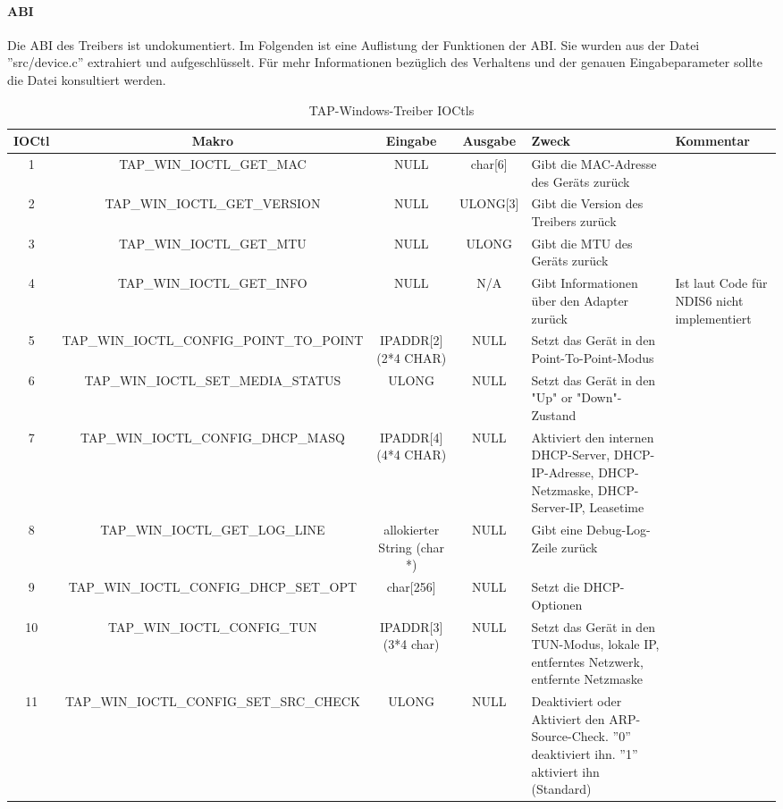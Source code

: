 \paragraph{ABI}
Die \ac{ABI} des Treibers ist undokumentiert. Im Folgenden ist eine Auflistung
der Funktionen der \ac{ABI}. Sie wurden aus der Datei ''src/device.c'' extrahiert
und aufgeschlüsselt. Für mehr Informationen bezüglich des Verhaltens und der
genauen Eingabeparameter sollte die Datei konsultiert werden.

\begin{table}
\tiny
\begin{tabularx}{\textwidth}{|c|c|c|c|X|X|}\firsthline
IOCtl & Makro & Eingabe & Ausgabe & Zweck & Kommentar \\ \hline
1 & TAP\_WIN\_IOCTL\_GET\_MAC & NULL & char[6] & Gibt die MAC-Adresse des Geräts zurück & \\ \hline
2 & TAP\_WIN\_IOCTL\_GET\_VERSION & NULL & ULONG[3] & Gibt die Version des Treibers zurück & \\ \hline
3 & TAP\_WIN\_IOCTL\_GET\_MTU & NULL & ULONG & Gibt die \ac{MTU} des Geräts zurück & \\ \hline
4 & TAP\_WIN\_IOCTL\_GET\_INFO & NULL & N/A & Gibt Informationen über den Adapter zurück
& Ist laut Code für NDIS6 nicht implementiert \\ \hline 
5 & TAP\_WIN\_IOCTL\_CONFIG\_POINT\_TO\_POINT & IPADDR[2] (2*4 CHAR) & NULL & Setzt das Gerät in den Point-To-Point-Modus
& \\ \hline
6 & TAP\_WIN\_IOCTL\_SET\_MEDIA\_STATUS & ULONG & NULL & Setzt das Gerät in den "Up" or "Down"-Zustand & \\ \hline
7 & TAP\_WIN\_IOCTL\_CONFIG\_DHCP\_MASQ & IPADDR[4] (4*4 CHAR) & NULL & Aktiviert den internen DHCP-Server, DHCP-IP-Adresse, DHCP-Netzmaske, DHCP-Server-IP, Leasetime & \\ \hline
8 & TAP\_WIN\_IOCTL\_GET\_LOG\_LINE & allokierter String (char *) & NULL & Gibt eine Debug-Log-Zeile zurück & \\ \hline
9 & TAP\_WIN\_IOCTL\_CONFIG\_DHCP\_SET\_OPT & char[256] & NULL & Setzt die DHCP-Optionen & \\ \hline
10 & TAP\_WIN\_IOCTL\_CONFIG\_TUN & IPADDR[3] (3*4 char) & NULL & Setzt das Gerät in den TUN-Modus, lokale IP, entferntes Netzwerk, entfernte Netzmaske & \\ \hline
11 & TAP\_WIN\_IOCTL\_CONFIG\_SET\_SRC\_CHECK & ULONG & NULL & Deaktiviert oder Aktiviert den ARP-Source-Check. ''0'' deaktiviert ihn. ''1'' aktiviert ihn (Standard) & \\ \hline
\end{tabularx}
\caption{TAP-Windows-Treiber IOCtls}
\label{fig:tap-ioctls}
\end{table}

